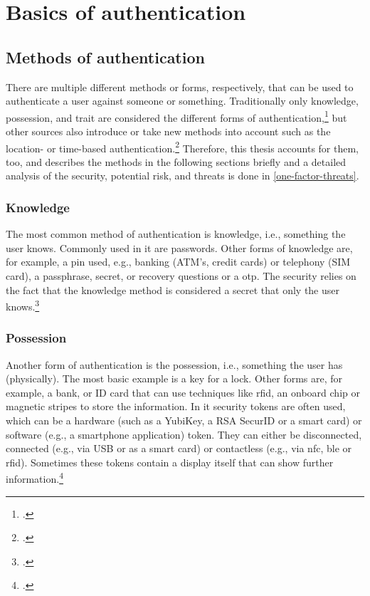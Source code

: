 \chapter{Basics of authentication}
\label{chapter:basics}

\section{Methods of authentication}
There are multiple different methods or forms, respectively, that can be used to authenticate a user against someone or something. Traditionally only knowledge, possession, and trait are considered the different forms of authentication,\footcites[See][299]{10.2307/27845364}[See][140]{brotherston2017defensive}[][47]{anderson2008security} but other sources also introduce or take new methods into account such as the location- or time-based authentication.\footcites[][]{6296127}[See][191]{dasgupta2017multi} Therefore, this thesis accounts for them, too, and describes the methods in the following sections briefly and a detailed analysis of the security, potential risk, and threats is done in \autoref{one-factor-threats}.

\subsection{Knowledge}

The most common method of authentication is knowledge, i.e., \frqq something the user knows\flqq{}. Commonly used in \gls{it} are passwords. Other forms of knowledge are, for example, a \gls{pin} used, e.g., banking (ATM's, credit cards) or telephony (SIM card), a passphrase, secret, or recovery questions or a \gls{otp}. The security relies on the fact that the knowledge method is considered a secret that only the user knows.\footcite[See][467]{eckert-it-sec-9}

\subsection{Possession}

Another form of authentication is the possession, i.e., \frqq something the user has\flqq{} (physically). The most basic example is a key for a lock. Other forms are, for example, a bank, or ID card that can use techniques like \gls{rfid}, an onboard chip or magnetic stripes to store the information. In \gls{it} security tokens are often used, which can be a hardware (such as a YubiKey, a RSA SecurID or a smart card) or software (e.g., a smartphone application) token. They can either be disconnected, connected (e.g., via USB or as a smart card) or contactless (e.g., via \gls{nfc}, \gls{ble} or \gls{rfid}). Sometimes these tokens contain a display itself that can show further information.\footcites[See][24]{265831}[][]{Dressel:2019:SZT:3319499.3328225}[See][8--11]{1698485}

